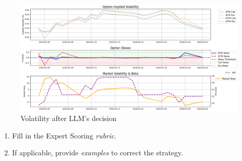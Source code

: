 \documentclass[8pt]{scrartcl}
\begin{document}
\begin{figure}[H]
    \centering
    \includegraphics[width=1\linewidth]{judge_reviews/META_M_gpt-4o-mini/2016-01-04/llm_Market_Volatility_&_Beta.png}
    \caption{Volatility after LLM's decision}
\end{figure}

\begin{tcolorbox}[colback=blue!10, colframe=blue!60, title=\textbf{TASKS}, sharp corners=southwest]
\begin{enumerate}
    \item Fill in the Expert Scoring \textit{rubric}.
    \item If applicable, provide \textit{examples} to correct the strategy.
\end{enumerate}
\end{tcolorbox}
\newpage
\end{document}
